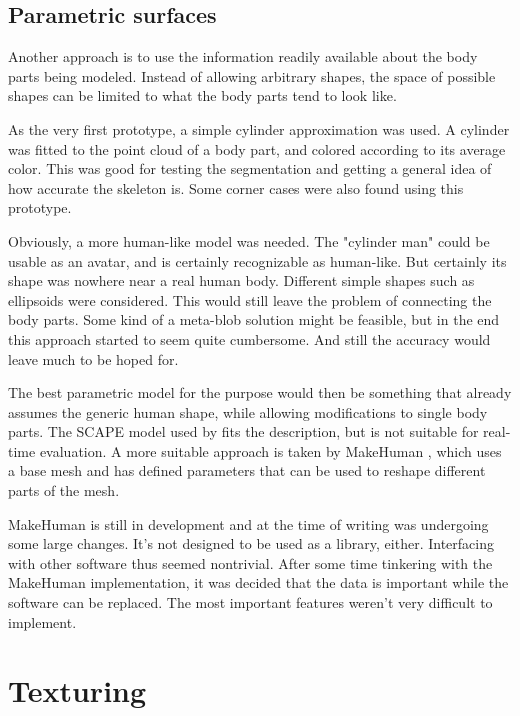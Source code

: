 \subsection{Parametric surfaces}

Another approach is to use the information readily available about the body parts being modeled. Instead of allowing arbitrary shapes, the space of possible shapes can be limited to what the body parts tend to look like.

As the very first prototype, a simple cylinder approximation was used. A cylinder was fitted to the point cloud of a body part, and colored according to its average color. This was good for testing the segmentation and getting a general idea of how accurate the skeleton is. Some corner cases were also found using this prototype.

Obviously, a more human-like model was needed. The "cylinder man" could be usable as an avatar, and is certainly recognizable as human-like. But certainly its shape was nowhere near a real human body. Different simple shapes such as ellipsoids were considered. This would still leave the problem of connecting the body parts. Some kind of a meta-blob solution might be feasible, but in the end this approach started to seem quite cumbersome. And still the accuracy would leave much to be hoped for.

The best parametric model for the purpose would then be something that already assumes the generic human shape, while allowing  modifications to single body parts. The SCAPE model \citep{} used by \citet{} fits the description, but is not suitable for real-time evaluation. A more suitable approach is taken by MakeHuman \citep{}, which uses a base mesh and has defined parameters that can be used to reshape different parts of the mesh.

MakeHuman is still in development and at the time of writing was undergoing some large changes. It's not designed to be used as a library, either. Interfacing with other software thus seemed nontrivial. After some time tinkering with the MakeHuman implementation, it was decided that the data is important while the software can be replaced. The most important features weren't very difficult to implement.


\section{Texturing}

